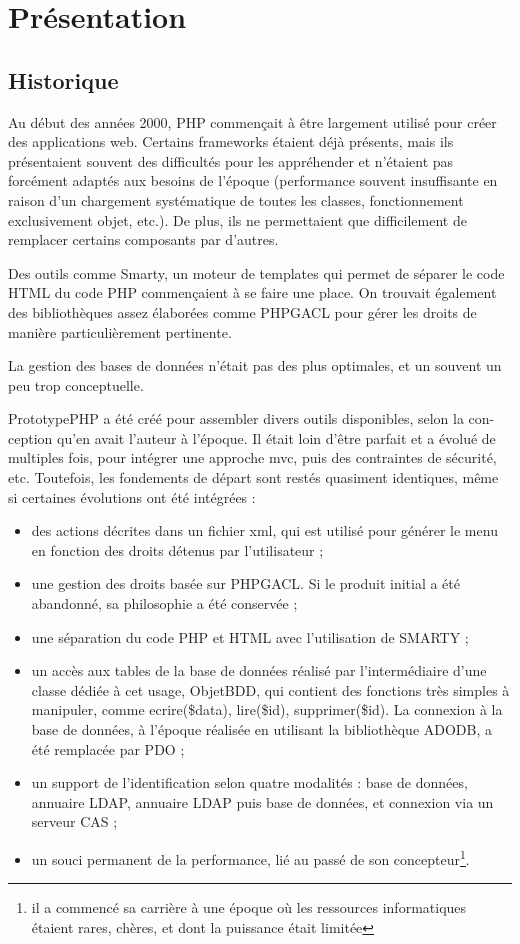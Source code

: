 \chapter*{Présentation}
\section*{Historique}
Au début des années 2000, PHP commençait à être largement utilisé pour créer des applications web. Certains frameworks étaient déjà présents, mais ils présentaient souvent des difficultés pour les appréhender et n'étaient pas forcément adaptés aux besoins de l'époque (performance souvent insuffisante en raison d'un chargement systématique de toutes les classes, fonctionnement exclusivement objet, etc.). De plus, ils ne permettaient que difficilement de remplacer certains composants par d'autres.

Des outils comme Smarty, un moteur de templates qui permet de séparer le code HTML du code PHP commençaient à se faire une place. On trouvait également des bibliothèques assez élaborées comme PHPGACL pour gérer les droits de manière particulièrement pertinente.

La gestion des bases de données n'était pas des plus optimales, et un souvent un peu trop conceptuelle.

PrototypePHP a été créé pour assembler divers outils disponibles, selon la con-ception qu'en avait l'auteur à l'époque. Il était loin d'être parfait et a évolué de multiples fois, pour intégrer une approche mvc, puis des contraintes de sécurité, etc. Toutefois, les fondements de départ sont restés quasiment identiques, même si certaines évolutions ont été intégrées :
\begin{itemize}
\item des actions décrites dans un fichier xml, qui est utilisé pour générer le menu en fonction des droits détenus par l'utilisateur ;
\item une gestion des droits basée sur PHPGACL. Si le produit initial a été abandonné, sa philosophie a été conservée ;
\item une séparation du code PHP et HTML avec l'utilisation de SMARTY ;
\item un accès aux tables de la base de données réalisé par l'intermédiaire d'une classe dédiée à cet usage, ObjetBDD, qui contient des fonctions très simples à manipuler, comme ecrire(\$data), lire(\$id), supprimer(\$id). La connexion à la base de données, à l'époque réalisée en utilisant la bibliothèque ADODB, a été remplacée par PDO ;
\item un support de l'identification selon quatre modalités : base de données, annuaire LDAP, annuaire LDAP puis base de données, et connexion via un serveur CAS ;
\item un souci permanent de la performance, lié au passé de son concepteur\footnote{il a commencé sa carrière à une époque où les ressources informatiques étaient rares, chères, et dont la puissance était limitée}.
\end{itemize}

